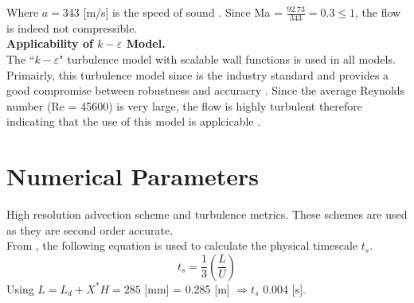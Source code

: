 Where $a=343$ [m/s] is the speed of sound \cite{fluids}. Since Ma = $\tfrac{92.73}{343}=0.3 \leq 1$, the flow is indeed not compressible.\\

\textbf{Applicability of $k-\varepsilon$ Model.}\\
The ``$k-\varepsilon$" turbulence model with scalable wall functions is used in all models. Primairly, this turbulence model since is the industry standard and provides a good compromise between robustness and accuracry \cite{cfx}. Since the average Reynolds number (Re = 45600) is very large, the flow is highly turbulent therefore indicating that the use of this model is applcicable \cite{cfdbook}.

\section{Numerical Parameters}
\label{sec:pre_num}

High resolution advection scheme and turbulence metrics. These schemes are used as they are second order accurate.\\

%
%
%
%
%

From \cite{tut}, the following equation is used to calculate the physical timescale $t_s$. 
\begin{equation}
	\label{eq:ts}
	t_s = \frac{1}{3} \left( \frac{L}{U} \right)
\end{equation}
Using $L = L_d + X^* H = 285$ [mm] = 0.285 [m] $\Rightarrow t_s$ 0.004 [s].\\  


